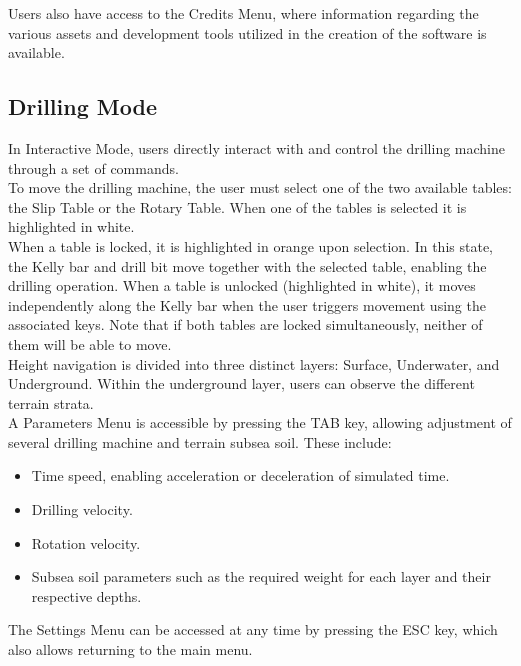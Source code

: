 \documentclass{article}
\begin{document}
Users also have access to the Credits Menu, where information regarding the various assets and development tools utilized in the creation of the software is available.

\subsection{Drilling Mode}\hfill

In Interactive Mode, users directly interact with and control the drilling machine through a set of commands.\\

To move the drilling machine, the user must select one of the two available tables: the Slip Table or the Rotary Table. When one of the tables is selected it is highlighted in white.\\

When a table is locked, it is highlighted in orange upon selection. In this state, the Kelly bar and drill bit move together with the selected table, enabling the drilling operation. When a table is unlocked (highlighted in white), it moves independently along the Kelly bar when the user triggers movement using the associated keys. Note that if both tables are locked simultaneously, neither of them will be able to move.\\

Height navigation is divided into three distinct layers: Surface, Underwater, and Underground. Within the underground layer, users can observe the different terrain strata.\\

A Parameters Menu is accessible by pressing the TAB key, allowing adjustment of several drilling machine and terrain subsea soil. These include:
\begin{itemize}
    \item Time speed, enabling acceleration or deceleration of simulated time.
    \item Drilling velocity.
    \item Rotation velocity.
    \item Subsea soil  parameters such as the required weight for each layer and their respective depths.
\end{itemize}

The Settings Menu can be accessed at any time by pressing the ESC key, which also allows returning to the main menu.\\
\end{document}
